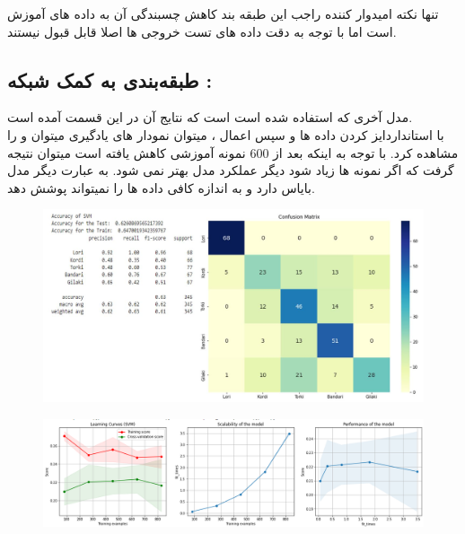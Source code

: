 \documentclass[10pt,onecolumn,a4paper]{article}
\begin{document}
تنها نکته امیدوار کننده راجب این طبقه بند کاهش چسبندگی آن به داده های آموزش است اما با توجه به دقت داده های تست خروجی ها اصلا قابل قبول نیستند.


\subsection{طبقه‌بندی به کمک شبکه :}

مدل آخری که استفاده شده است   
است که نتایج آن در این قسمت آمده است.\\
با  استانداردایز کردن داده ها و سپس اعمال ، میتوان نمودار های یادگیری  میتوان و  را مشاهده کرد. با توجه به اینکه بعد از 600 نمونه آموزشی   کاهش یافته است میتوان نتیجه گرفت که اگر نمونه ها زیاد شود دیگر عملکرد مدل بهتر نمی شود. به عبارت دیگر مدل بایاس دارد و به اندازه کافی  داده ها را نمیتواند پوشش دهد.


\begin{figure}[h!]
        \centering
        \includegraphics[scale=0.35]{k.JPG}
        \caption{  }  
    \end{figure}

\begin{figure}[h!]
        \centering
        \includegraphics[scale=0.4]{l.png}
        \caption{  }  
    \end{figure}
\end{document}
